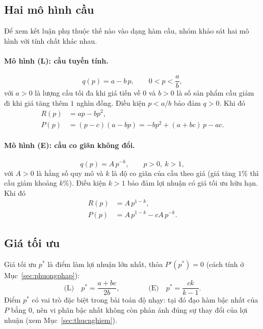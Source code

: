 \subsection{Hai mô hình cầu}
Để xem kết luận phụ thuộc thế nào vào dạng hàm cầu, nhóm khảo sát hai mô hình với
tính chất khác nhau.

\paragraph{Mô hình (L): cầu tuyến tính.}
\begin{equation}
q(p) = a - b\,p, \qquad 0 < p < \frac{a}{b},
\end{equation}
với $a>0$ là lượng cầu tối đa khi giá tiến về $0$ và $b>0$ là số sản phẩm cầu giảm đi
khi giá tăng thêm $1$ nghìn đồng. Điều kiện $p<a/b$ bảo đảm $q>0$. Khi đó
\begin{align}
R(p) &= ap - bp^2, \\
P(p) &= (p-c)(a-bp) = -bp^2 + (a+bc)\,p - ac.
\end{align}

\paragraph{Mô hình (E): cầu co giãn không đổi.}
\begin{equation}
q(p) = A\,p^{-k}, \qquad p>0,\ k>1,
\end{equation}
với $A>0$ là hằng số quy mô và $k$ là độ co giãn của cầu theo giá (giá tăng $1\%$ thì
cầu giảm khoảng $k\%$). Điều kiện $k>1$ bảo đảm lợi nhuận có giá tối ưu hữu hạn. Khi đó
\begin{align}
R(p) &= A\,p^{1-k}, \\
P(p) &= A\,p^{1-k} - cA\,p^{-k}.
\end{align}

\subsection{Giá tối ưu}
Giá tối ưu $p^*$ là điểm làm lợi nhuận lớn nhất, thỏa $P'(p^*)=0$ (cách tính ở
Mục~\ref{sec:phuongphap}):
\begin{equation}
\text{(L)}\quad p^* = \frac{a+bc}{2b}, \qquad\qquad
\text{(E)}\quad p^* = \frac{ck}{k-1}.
\end{equation}
Điểm $p^*$ có vai trò đặc biệt trong bài toán độ nhạy: tại đó đạo hàm bậc nhất của $P$
bằng $0$, nên vi phân bậc nhất không còn phản ánh đúng sự thay đổi của lợi nhuận
(xem Mục~\ref{sec:thucnghiem}).

